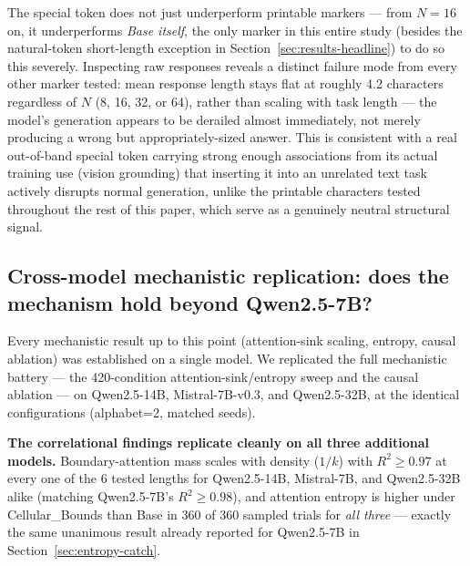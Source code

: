\documentclass[11pt]{article}
\begin{document}
The special token does not just underperform printable markers --- from $N=16$ on, it underperforms \emph{Base itself}, the only marker in this entire study (besides the natural-token short-length exception in Section~\ref{sec:results-headline}) to do so this severely. Inspecting raw responses reveals a distinct failure mode from every other marker tested: mean response length stays flat at roughly 4.2 characters regardless of $N$ (8, 16, 32, or 64), rather than scaling with task length --- the model's generation appears to be derailed almost immediately, not merely producing a wrong but appropriately-sized answer. This is consistent with a real out-of-band special token carrying strong enough associations from its actual training use (vision grounding) that inserting it into an unrelated text task actively disrupts normal generation, unlike the printable characters tested throughout the rest of this paper, which serve as a genuinely neutral structural signal.

\subsection{Cross-model mechanistic replication: does the mechanism hold beyond Qwen2.5-7B?}
\label{sec:cross-model-replication}

Every mechanistic result up to this point (attention-sink scaling, entropy, causal ablation) was established on a single model. We replicated the full mechanistic battery --- the 420-condition attention-sink/entropy sweep and the causal ablation --- on Qwen2.5-14B, Mistral-7B-v0.3, and Qwen2.5-32B, at the identical configurations (alphabet=2, matched seeds).

\textbf{The correlational findings replicate cleanly on all three additional models.} Boundary-attention mass scales with density ($1/k$) with $R^2 \geq 0.97$ at every one of the 6 tested lengths for Qwen2.5-14B, Mistral-7B, and Qwen2.5-32B alike (matching Qwen2.5-7B's $R^2 \geq 0.98$), and attention entropy is higher under Cellular\_Bounds than Base in 360 of 360 sampled trials for \emph{all three} --- exactly the same unanimous result already reported for Qwen2.5-7B in Section~\ref{sec:entropy-catch}.
\end{document}
